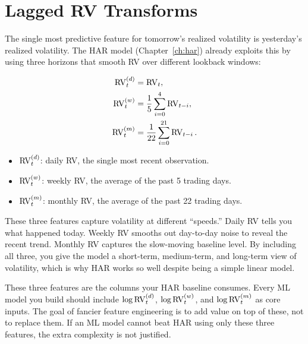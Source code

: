 \section{Lagged RV Transforms}\label{sec:feat-lagged-rv}

The single most predictive feature for tomorrow's realized volatility is yesterday's realized volatility.
The HAR model (Chapter~\ref{ch:har}) already exploits this by using three horizons that smooth RV over different lookback windows:

\begin{align}
\operatorname{RV}_t^{(d)} &= \operatorname{RV}_t, \label{eq:rv-d}\\
\operatorname{RV}_t^{(w)} &= \frac{1}{5}\sum_{i=0}^{4} \operatorname{RV}_{t-i}, \label{eq:rv-w}\\
\operatorname{RV}_t^{(m)} &= \frac{1}{22}\sum_{i=0}^{21} \operatorname{RV}_{t-i}. \label{eq:rv-m}
\end{align}
\begin{itemize}[nosep]
  \item $\operatorname{RV}_t^{(d)}$: daily RV, the single most recent observation.
  \item $\operatorname{RV}_t^{(w)}$: weekly RV, the average of the past 5 trading days.
  \item $\operatorname{RV}_t^{(m)}$: monthly RV, the average of the past 22 trading days.
\end{itemize}

\begin{intuition}
These three features capture volatility at different ``speeds.'' Daily RV tells you what happened today. Weekly RV smooths out day-to-day noise to reveal the recent trend. Monthly RV captures the slow-moving baseline level. By including all three, you give the model a short-term, medium-term, and long-term view of volatility, which is why HAR works so well despite being a simple linear model.
\end{intuition}

\begin{projectconnection}
These three features are the columns your HAR baseline consumes. Every ML model you build should include $\log \operatorname{RV}_t^{(d)}$, $\log \operatorname{RV}_t^{(w)}$, and $\log \operatorname{RV}_t^{(m)}$ as core inputs. The goal of fancier feature engineering is to add value on top of these, not to replace them. If an ML model cannot beat HAR using only these three features, the extra complexity is not justified.
\end{projectconnection}


